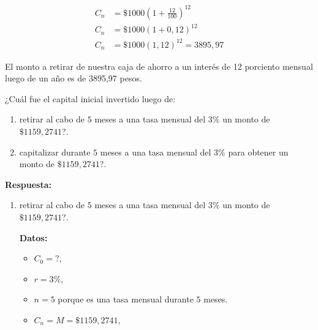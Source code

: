 \documentclass[12pt]{examdesign}
\theoremstyle{plain}
\theoremstyle{definition}
\theoremstyle{remark}
\begin{document}
\begin{shortanswer}[title={Leemos el material de consulta y realizamos las actividades propuestas.}, rearrange=no]
\begin{question}
\begin{answer}
\begin{enumerate}
    	    		\begin{align}
    	    		    C_{n} &= \$1000\left( 1+\frac{12}{100} \right)^{12}\\
    	    		    C_{n} &= \$1000\left( 1+0,12 \right)^{12}\\
    	    		    C_{n} &= \$1000\left( 1,12 \right)^{12}= 3895,97 
    	    		\end{align}
    	    		
    	    		El monto a retirar de nuestra caja de ahorro a un interés de 12 porciento mensual luego de un año es de 3895,97 pesos.
    	    		
    	    	\end{enumerate}
    	    \end{answer}
    	\end{question}
        
        \begin{question}
        	¿Cuál fue el capital inicial invertido luego de:	
        	\begin{enumerate}
        		\item retirar al cabo de $5$ meses a una tasa mensual del $3\%$ un monto de $\$1159,2741$?.
        		\item capitalizar durante $5$ meses a una tasa mensual del $3\%$ para obtener un monto de $\$1159,2741$?.
        	\end{enumerate}
        	\begin{answer}
        		\textbf{Respuesta:}
        		\begin{enumerate}
        			\item retirar al cabo de $5$ meses a una tasa mensual del $3\%$ un monto de $\$1159,2741$?.
        			    
        			    \textbf{Datos:}
        			    
        			    \begin{itemize}
        			    	\item $C_{0}=?$,
        			    	\item $r=3\%$,
        			    	\item $n=5$ porque es una tasa mensual durante $5$ meses.
        			    	\item $C_{n}=M=\$1159,2741$,
        			    \end{itemize}
        		    

\end{enumerate}
\end{answer}
\end{question}
\end{shortanswer}
\end{document}
